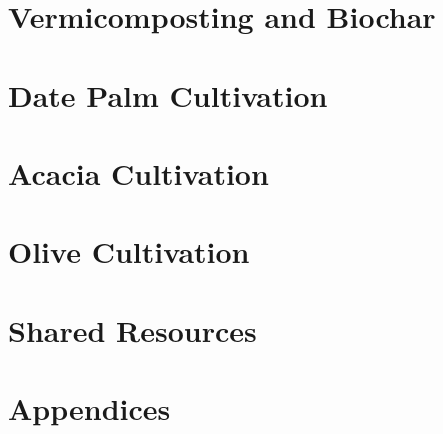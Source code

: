\documentclass[12pt,a4paper]{report}
\begin{document}
\chapter{Vermicomposting and Biochar}









\chapter{Date Palm Cultivation}









\chapter{Acacia Cultivation}









\chapter{Olive Cultivation}









\chapter{Shared Resources}


%
%
%
%
%
%

\chapter{Appendices}
%
%
%
\end{document}
